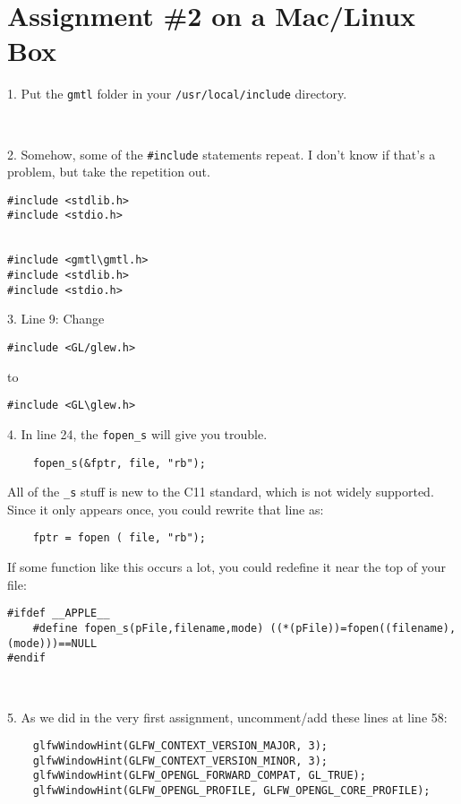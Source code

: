 \section{Assignment \#2 on  a Mac/Linux Box}

1.  Put the {\tt gmtl} folder in your {\tt /usr/local/include} directory.  

\

2.  Somehow, some of the {\tt \#include} statements repeat.  I don't know if that's a problem, but take the repetition out.  

\begin{verbatim}
#include <stdlib.h>
#include <stdio.h>


#include <gmtl\gmtl.h>
#include <stdlib.h>
#include <stdio.h>
\end{verbatim}

3.  Line 9:  Change 

\begin{verbatim}#include <GL/glew.h>\end{verbatim} 

to  

\begin{verbatim}#include <GL\glew.h>\end{verbatim}

4.  In line 24, the {\tt fopen\_s} will give you trouble.  

\begin{verbatim}
	fopen_s(&fptr, file, "rb");	
\end{verbatim}


All of the {\tt *\_s} stuff is new to the C11 standard, which is not widely supported.  Since it only appears once, you could rewrite that line as:

\begin{verbatim}
	fptr = fopen ( file, "rb");
\end{verbatim}

If some function like this occurs a lot, you could redefine it near the top of your file:

\begin{verbatim}
#ifdef __APPLE__
    #define fopen_s(pFile,filename,mode) ((*(pFile))=fopen((filename),(mode)))==NULL
#endif
\end{verbatim}


\

5.  As we did in the very first assignment, uncomment/add these lines at line 58:

\begin{verbatim}
    glfwWindowHint(GLFW_CONTEXT_VERSION_MAJOR, 3);
    glfwWindowHint(GLFW_CONTEXT_VERSION_MINOR, 3);
    glfwWindowHint(GLFW_OPENGL_FORWARD_COMPAT, GL_TRUE);
    glfwWindowHint(GLFW_OPENGL_PROFILE, GLFW_OPENGL_CORE_PROFILE);
\end{verbatim}

